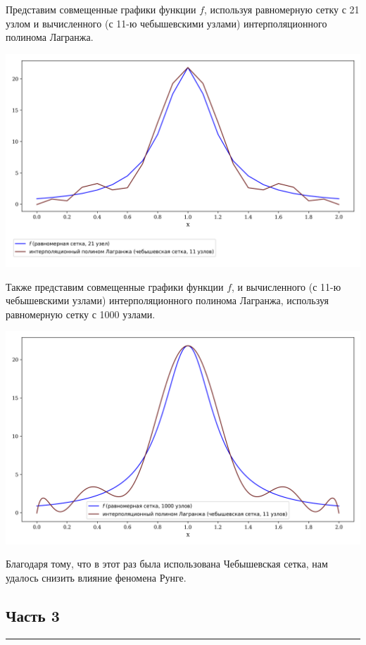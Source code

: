 \documentclass[a4paper, 14pt]{extarticle}
\begin{document}
Представим совмещенные графики функции $f$, используя равномерную сетку с 21 узлом и 
вычисленного (с 11-ю чебышевскими узлами) интерполяционного полинома Лагранжа.

\begin{center}
  \includegraphics[width=1\textwidth]{chebushevXref21.png}
\end{center}

Также представим совмещенные графики функции $f$, и 
вычисленного (с 11-ю чебышевскими узлами) интерполяционного полинома Лагранжа, 
используя равномерную сетку с 1000 узлами.

\begin{center}
  \includegraphics[width=1\textwidth]{chebushevXref1000}
\end{center}

Благодаря тому, что в этот раз была использована Чебышевская сетка, нам удалось 
снизить влияние феномена Рунге.

\subsection*{Часть 3}\vspace{-20pt}\rule{\linewidth}{0.1mm}
\end{document}
